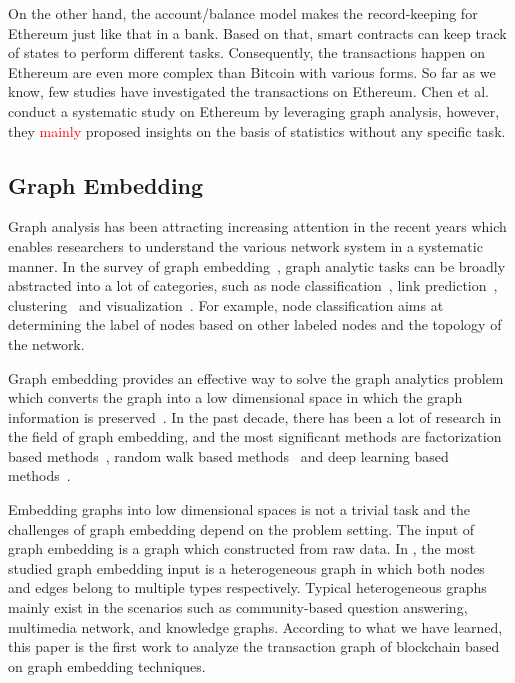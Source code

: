 On the other hand, the account/balance model makes the record-keeping for Ethereum just like that in a bank. Based on that, smart contracts can keep track of states to perform different tasks. Consequently, the transactions happen on Ethereum are even more complex than Bitcoin with various forms. So far as we know, few studies have investigated the transactions on Ethereum. Chen et al.~\cite{chen2018infocom} conduct a systematic study on Ethereum by leveraging graph analysis, however, they \textcolor{red}{mainly} proposed insights on the basis of statistics without any specific task. 


\subsection{Graph Embedding}
Graph analysis has been attracting increasing attention in the recent years which enables researchers to understand the various network system in a systematic manner. In the survey of graph embedding~\cite{cai2018comprehensive}, graph analytic tasks can be broadly abstracted into a lot of categories, such as node classification~\cite{bhagat2011node}, link prediction~\cite{liben2007link}, clustering~\cite{ding2001min} and visualization~\cite{maaten2008visualizing}. For example, node classification aims at determining the label of nodes based on other labeled nodes and the topology of the network.

Graph embedding provides an effective way to solve the graph analytics problem which converts the graph into a low dimensional space in which the graph information is preserved~\cite{hamilton2017representation}. In the past decade, there has been a lot of research in the field of graph embedding, and the most significant methods are factorization based methods~\cite{ahmed2013distributed,belkin2002laplacian,roweis2000nonlinear}, random walk based methods~\cite{perozzi2014deepwalk,grover2016node2vec} and deep learning based methods~\cite{wang2016structural,kipf2016semi}. 

Embedding graphs into low dimensional spaces is not a trivial task and the challenges of graph embedding depend on the problem setting. The input of graph embedding is a graph which constructed from raw data. In \cite{goyal2018graph}, the most studied graph embedding input is a heterogeneous graph in which both nodes and edges belong to multiple types respectively. Typical heterogeneous graphs mainly exist in the scenarios such as community-based question answering, multimedia network, and knowledge graphs. According to what we have learned, this paper is the first work to analyze the transaction graph of blockchain based on graph embedding techniques.